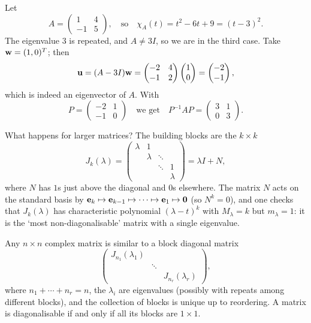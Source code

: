 \documentclass[a4paper]{scrartcl}
\begin{document}
\begin{example}
	Let
	$$
	A = \begin{pmatrix}
		1 & 4 \\ -1 & 5
	\end{pmatrix}, \quad \text{so} \quad \chi_A(t) = t^2 - 6t + 9 = (t - 3)^2.
	$$
	The eigenvalue $3$ is repeated, and $A \neq 3I$, so we are in the third case. Take $\mathbf{w} = (1, 0)^T$; then
	$$
	\mathbf{u} = (A - 3I)\mathbf{w} = \begin{pmatrix}
		-2 & 4 \\ -1 & 2
	\end{pmatrix}\begin{pmatrix}
		1 \\ 0
	\end{pmatrix} = \begin{pmatrix}
		-2 \\ -1
	\end{pmatrix},
	$$
	which is indeed an eigenvector of $A$. With
	$$
	P = \begin{pmatrix}
		-2 & 1 \\ -1 & 0
	\end{pmatrix} \quad \text{we get} \quad P^{-1}AP = \begin{pmatrix}
		3 & 1 \\ 0 & 3
	\end{pmatrix}.
	$$
\end{example}

What happens for larger matrices? The building blocks are the $k \times k$ 
$$
J_k(\lambda) = \begin{pmatrix}
	\lambda & 1 & & \\
	& \lambda & \ddots & \\
	& & \ddots & 1\\
	& & & \lambda
\end{pmatrix} = \lambda I + N,
$$
where $N$ has $1$s just above the diagonal and $0$s elsewhere. The matrix $N$ acts on the standard basis by $\mathbf{e}_k \mapsto \mathbf{e}_{k-1} \mapsto \cdots \mapsto \mathbf{e}_1 \mapsto \mathbf{0}$ (so $N^k = 0$), and one checks that $J_k(\lambda)$ has characteristic polynomial $(\lambda - t)^k$ with $M_\lambda = k$ but $m_\lambda = 1$: it is the `most non-diagonalisable' matrix with a single eigenvalue.

\begin{theorem}
	Any $n \times n$ complex matrix is similar to a block diagonal matrix
	$$
	\begin{pmatrix}
		J_{n_1}(\lambda_1) & & \\
		& \ddots & \\
		& & J_{n_r}(\lambda_r)
	\end{pmatrix},
	$$
	where $n_1 + \cdots + n_r = n$, the $\lambda_i$ are eigenvalues (possibly with repeats among different blocks), and the collection of blocks is unique up to reordering. A matrix is diagonalisable if and only if all its blocks are $1 \times 1$.
\end{theorem}
\end{document}
